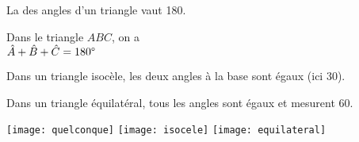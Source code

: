\begin{myprop}
	La  des angles d'un triangle vaut 180\degree.
\end{myprop}


\begin{myexs}
	\begin{multicols}{2}
		\vspace*{1cm}
			Dans le triangle $ABC$, on a \\ $\hat{A} + \hat{B} + \hat{C} = 180\degree$
		\vspace*{1cm}
		
		
			Dans un triangle isocèle, les deux angles à la base sont égaux (ici 30\degree).
			\vspace*{2.5cm}
		
		
			Dans un triangle équilatéral, tous les angles sont égaux et mesurent 60\degree.
			
		\begin{center}	
		\texttt{[image: quelconque]}	
		\texttt{[image: isocele]}	
		\texttt{[image: equilateral]}
		\end{center}
	\end{multicols}
\end{myexs}